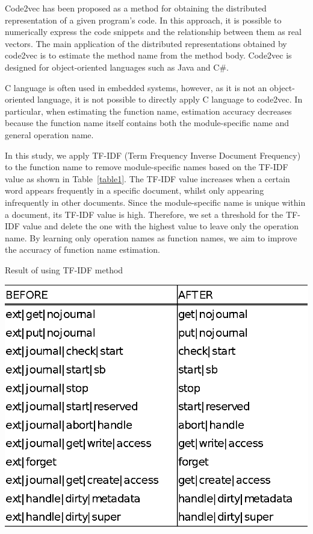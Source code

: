 \documentclass[JIP]{apris}
\begin{document}
Code2vec\cite{alon2019code2vec} has been proposed as a method for obtaining the distributed representation of a given program’s code. In this approach, it is possible to numerically express the code snippets and the relationship between them as real vectors. The main application of the distributed representations obtained by code2vec is to estimate the method name from the method body. Code2vec is designed for object-oriented languages such as Java and C\#. 

C language is often used in embedded systems, however, as it is not an object-oriented language, it is not possible to directly apply C language to code2vec. In particular, when estimating the function name, estimation accuracy decreases because the function name itself contains both the module-specific name and general operation name.

In this study, we apply TF-IDF (Term Frequency Inverse Document Frequency)\cite{ramos2003using} to the function name to remove module-specific names based on the TF-IDF value as shown in Table~\ref{table1}. The TF-IDF value increases when a certain word appears frequently in a specific document, whilst only appearing infrequently in other documents. Since the module-specific name is unique within a document, its TF-IDF value is high. Therefore, we set a threshold for the TF-IDF value and delete the one with the highest value to leave only the operation name. By learning only operation names as function names, we aim to improve the accuracy of function name estimation. 

\begin{table}[t]
 \centering
 \caption{Result of using TF-IDF method}
 \includegraphics[width=1.0\hsize]{image/ITF-DFcompare.eps} 
 \label{table1} 
\end{table}
\end{document}
